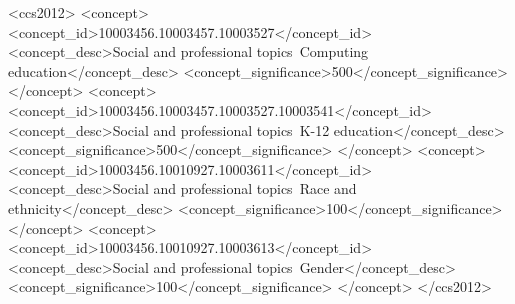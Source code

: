 
\begin{CCSXML}
<ccs2012>
<concept>
<concept_id>10003456.10003457.10003527</concept_id>
<concept_desc>Social and professional topics~Computing education</concept_desc>
<concept_significance>500</concept_significance>
</concept>
<concept>
<concept_id>10003456.10003457.10003527.10003541</concept_id>
<concept_desc>Social and professional topics~K-12 education</concept_desc>
<concept_significance>500</concept_significance>
</concept>
<concept>
<concept_id>10003456.10010927.10003611</concept_id>
<concept_desc>Social and professional topics~Race and ethnicity</concept_desc>
<concept_significance>100</concept_significance>
</concept>
<concept>
<concept_id>10003456.10010927.10003613</concept_id>
<concept_desc>Social and professional topics~Gender</concept_desc>
<concept_significance>100</concept_significance>
</concept>
</ccs2012>
\end{CCSXML}


